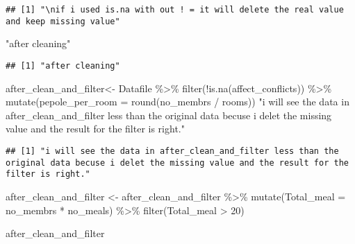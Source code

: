 \documentclass[
]{article}
\newenvironment{Shaded}{\begin{snugshade}}{\end{snugshade}}
\newcommand{\AttributeTok}[1]{\textcolor[rgb]{0.77,0.63,0.00}{#1}}
\newcommand{\DecValTok}[1]{\textcolor[rgb]{0.00,0.00,0.81}{#1}}
\newcommand{\FunctionTok}[1]{\textcolor[rgb]{0.00,0.00,0.00}{#1}}
\newcommand{\NormalTok}[1]{#1}
\newcommand{\OtherTok}[1]{\textcolor[rgb]{0.56,0.35,0.01}{#1}}
\newcommand{\SpecialCharTok}[1]{\textcolor[rgb]{0.00,0.00,0.00}{#1}}
\newcommand{\StringTok}[1]{\textcolor[rgb]{0.31,0.60,0.02}{#1}}
\begin{document}
\begin{verbatim}
## [1] "\nif i used is.na with out ! = it will delete the real value and keep missing value"
\end{verbatim}

\begin{Shaded}
\begin{Highlighting}[]
\StringTok{"after cleaning"}
\end{Highlighting}
\end{Shaded}

\begin{verbatim}
## [1] "after cleaning"
\end{verbatim}

\begin{Shaded}
\begin{Highlighting}[]
\NormalTok{after\_clean\_and\_filter}\OtherTok{\textless{}{-}}\NormalTok{ Datafile }\SpecialCharTok{\%\textgreater{}\%} 
  \FunctionTok{filter}\NormalTok{(}\SpecialCharTok{!}\FunctionTok{is.na}\NormalTok{(affect\_conflicts)) }\SpecialCharTok{\%\textgreater{}\%} 
  \FunctionTok{mutate}\NormalTok{(}\AttributeTok{pepole\_per\_room =} \FunctionTok{round}\NormalTok{(no\_membrs }\SpecialCharTok{/}\NormalTok{ rooms))}
\StringTok{"i will see the data in after\_clean\_and\_filter less than the original data becuse i delet the missing value and the result for the filter is right."}
\end{Highlighting}
\end{Shaded}

\begin{verbatim}
## [1] "i will see the data in after_clean_and_filter less than the original data becuse i delet the missing value and the result for the filter is right."
\end{verbatim}

\begin{Shaded}
\begin{Highlighting}[]
\NormalTok{after\_clean\_and\_filter }\OtherTok{\textless{}{-}}\NormalTok{ after\_clean\_and\_filter }\SpecialCharTok{\%\textgreater{}\%} 
  \FunctionTok{mutate}\NormalTok{(}\AttributeTok{Total\_meal =}\NormalTok{ no\_membrs }\SpecialCharTok{*}\NormalTok{ no\_meals) }\SpecialCharTok{\%\textgreater{}\%} 
  \FunctionTok{filter}\NormalTok{(Total\_meal }\SpecialCharTok{\textgreater{}} \DecValTok{20}\NormalTok{)}

\NormalTok{after\_clean\_and\_filter}
\end{Highlighting}
\end{Shaded}
\end{document}
